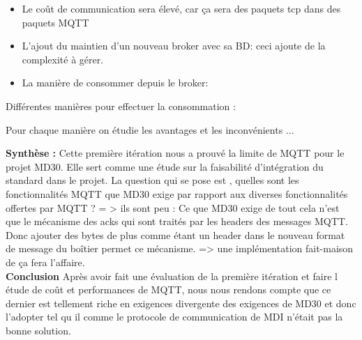     \begin{itemize}
        \renewcommand{\labelitemi}{$\bullet$}
        \item Le coût de communication sera élevé, car ça sera des paquets tcp dans des paquets MQTT 
        \item L'ajout du maintien d’un nouveau broker avec sa BD: ceci ajoute de la complexité à gérer.
        \item La manière de consommer depuis le broker: 
    \end{itemize}

    Différentes manières pour effectuer la consommation : 

    Pour chaque manière on étudie les avantages et les inconvénients ... 



    \textbf{Synthèse :}
    Cette première itération nous a prouvé la limite de MQTT pour le projet MD30. Elle sert comme une étude 
    sur la faisabilité d'intégration du standard dans le projet.
    La question qui se pose est , quelles sont les fonctionnalités MQTT que MD30 exige par rapport aux 
    diverses fonctionnalités offertes par MQTT ? = > ils sont peu : 
    Ce que MD30 exige de tout cela n’est que le mécanisme des acks qui sont traités par les headers des messages MQTT. 
    Donc ajouter des bytes de plus comme étant un header dans le nouveau format de message du boîtier permet ce mécanisme. 
    => une implémentation fait-maison de ça fera l'affaire. \\




    \textbf{Conclusion} \break
            Après avoir fait une évaluation de la première itération et faire l étude de coût et performances de MQTT, 
        nous nous rendons compte que ce dernier est tellement riche en exigences divergente des exigences de MD30 et 
        donc l'adopter tel qu il comme le protocole de communication de MDI n’était pas la bonne solution. 


    



  


